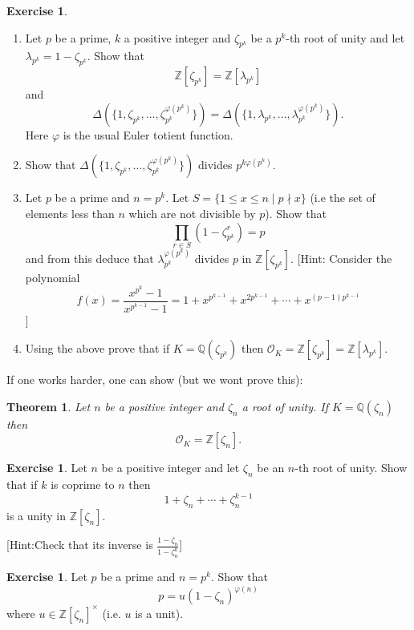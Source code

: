 \documentclass[11pt,a4paper]{report}
\theoremstyle{plain}
\newtheorem{thm}[subsection]{Theorem}
\theoremstyle{definition}
\theoremstyle{definition}
\newtheorem{question}[subsection]{Exercise}
\newcommand{\ZZ}{\mathbb{Z}}
\def\QQ{\mathbb{Q}}
\def \lam {\lambda}
\def \OO {\mathcal{O}}
\begin{document}
\begin{question}
\begin{enumerate}
	\item 	Let $p$ be a prime, $k$ a positive integer and $\zeta_{p^k}$ be a $p^k$-th root of unity and let $\lam_{p^k}=1-\zeta_{p^k}$. Show that \[\ZZ[\zeta_{p^k}]=\ZZ[\lam_{p^k}] \] and \[\Delta(\{1,\zeta_{p^k},\dots,\zeta_{p^k}^{\varphi(p^k)}\})=\Delta(\{1,\lam_{p^k},\dots,\lam_{p^k}^{\varphi(p^k)}\}).\] Here $\varphi$ is the usual Euler totient function.
	
	\item Show that $\Delta(\{1,\zeta_{p^k},\dots,\zeta_{p^k}^{\varphi(p^k)}\})$ divides $p^{k\varphi(p^k)}$.
	
	\item 		Let $p$ be a prime and $n=p^k$. Let $S=\{1 \leq x \leq n \mid p\nmid x\}$ (i.e the set of elements less than $n$ which are not divisible by $p$). Show that \[\prod_{r \in S} (1-\zeta_{p^k}^r)=p\] and from this deduce that $\lam_{p^k}^{\varphi(p^k)}$ divides $p$ in $\ZZ[\zeta_{p^k}]$. [Hint: Consider the polynomial \[f(x)=\frac{x^{p^k}-1}{x^{p^{k-1}}-1}=1+x^{p^{k-1}}+x^{2p^{k-1}}+\cdots+x^{(p-1)p^{k-1}} \]]  
	
	
	
	\item Using the above prove that if $K=\QQ(\zeta_{p^k})$ then $\OO_K=\ZZ[\zeta_{p^k}]=\ZZ[\lam_{p^k}]$.
	
\end{enumerate}

\end{question}



If one works harder, one can show (but we wont prove this):

\begin{thm}\label{thm: ring of ints of cyclo field}
Let $n$ be a positive integer and $\zeta_n$ a root of unity. If $K=\QQ(\zeta_n)$ then \[\OO_K=\ZZ[\zeta_n].\]
\end{thm}

\begin{question}
Let $n$ be a positive integer and let $\zeta_n$ be an $n$-th root of unity. Show that if $k$ is coprime to $n$ then \[1+\zeta_n+\cdots+\zeta_n^{k-1}\] is a unity in $\ZZ[\zeta_n]$.

[Hint:Check that its inverse is $\frac{1-\zeta_n}{1-\zeta_n^k}$] 
\end{question}

\begin{question}\label{ques: fac of p in p-th root}
Let $p$ be a prime and $n=p^k$. Show that \[p=u(1-\zeta_n)^{\varphi(n)}\] where $u \in \ZZ[\zeta_n]^{\times}$ (i.e. $u$ is a unit).
\end{question}
\end{document}
